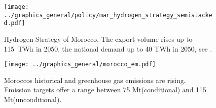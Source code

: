 \begin{figure}
    \centering
    \texttt{[image: ../graphics\_general/policy/mar\_hydrogen\_strategy\_semistacked.pdf]}
    \caption{Hydrogen Strategy of Morocco. The export volume rises up to 115~TWh in 2050, the national demand up to 40 TWh in 2050, see \cite{MarHyStrat2021}.}
    \label{fig:mar_hydrogen_strategy}
\end{figure}


\begin{figure}[h!]
    \centering
    \texttt{[image: ../graphics\_general/morocco\_em.pdf]}
    \caption{Moroccos historical \co and greenhouse gas emissions are rising. Emission targets offer a range between 75 Mt\coe (conditional) and 115 Mt\coe (unconditional).}
    \label{fig:morocco_em}
\end{figure}
